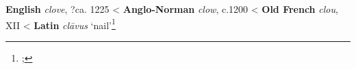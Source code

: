 \begin{etymology}\label{ety:clove}
\textbf{English} \textit{clove}, ?ca. 1225
< \textbf{Anglo-Norman} \textit{clow}, c.1200
< \textbf{Old French} \textit{clou}, XII
< \textbf{Latin} \textit{clāvus} `nail'\footnote{; }
\end{etymology}